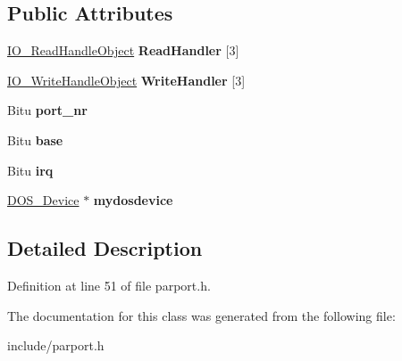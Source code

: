 \subsection*{Public Attributes}
\begin{DoxyCompactItemize}
\item 
\hypertarget{classCParallel_afb04319e90fc30254112b7552e2d45a3}{\hyperlink{classIO__ReadHandleObject}{I\-O\-\_\-\-Read\-Handle\-Object} {\bfseries Read\-Handler} \mbox{[}3\mbox{]}}\label{classCParallel_afb04319e90fc30254112b7552e2d45a3}

\item 
\hypertarget{classCParallel_acaf7de848aaf46f6b6b780264864cd9a}{\hyperlink{classIO__WriteHandleObject}{I\-O\-\_\-\-Write\-Handle\-Object} {\bfseries Write\-Handler} \mbox{[}3\mbox{]}}\label{classCParallel_acaf7de848aaf46f6b6b780264864cd9a}

\item 
\hypertarget{classCParallel_a5f04c351a88e683d6bb6f3e7185f7b36}{Bitu {\bfseries port\-\_\-nr}}\label{classCParallel_a5f04c351a88e683d6bb6f3e7185f7b36}

\item 
\hypertarget{classCParallel_a78326de3d93b2bf01aac0aa0d57b6b0f}{Bitu {\bfseries base}}\label{classCParallel_a78326de3d93b2bf01aac0aa0d57b6b0f}

\item 
\hypertarget{classCParallel_afebb5bfb64e0ec13cfb060ac02b8fb3c}{Bitu {\bfseries irq}}\label{classCParallel_afebb5bfb64e0ec13cfb060ac02b8fb3c}

\item 
\hypertarget{classCParallel_a4c49fe6eefcc72f5d47abdc2594e14f4}{\hyperlink{classDOS__Device}{D\-O\-S\-\_\-\-Device} $\ast$ {\bfseries mydosdevice}}\label{classCParallel_a4c49fe6eefcc72f5d47abdc2594e14f4}

\end{DoxyCompactItemize}


\subsection{Detailed Description}


Definition at line 51 of file parport.\-h.



The documentation for this class was generated from the following file\-:\begin{DoxyCompactItemize}
\item 
include/parport.\-h\end{DoxyCompactItemize}
